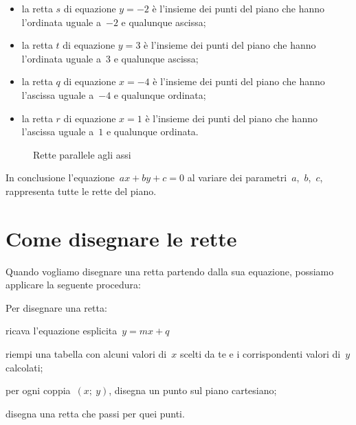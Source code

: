 \begin{itemize} [noitemsep]
 \item la retta \(s\) di equazione \(y=-2\) è l'insieme dei punti del piano 
  che hanno l'ordinata uguale a~\(-2\) e qualunque ascissa;
 \item la retta \(t\) di equazione \(y=3\) è l'insieme dei punti del piano 
  che hanno l'ordinata uguale a~\(3\) e qualunque ascissa;
 \item la retta \(q\) di equazione \(x=-4\) è l'insieme dei punti del piano 
  che hanno l'ascissa uguale a~\(-4\) e qualunque ordinata;
 \item la retta \(r\) di equazione \(x=1\) è l'insieme dei punti del piano 
  che hanno l'ascissa uguale a~\(1\) e qualunque ordinata.
\end{itemize}

\begin{inaccessibleblock}
 \begin{figure}[h]
 \centering
 \begin{minipage}[]{.40\textwidth}
\rettey
 \end{minipage}
 \begin{minipage}[]{.40\textwidth}
\rettex
 \end{minipage}
  \caption{Rette parallele agli assi}\label{fig:rette_p_assi}
\end{figure}
\end{inaccessibleblock}

In conclusione l'equazione~\(ax + by + c = 0\) al variare dei 
parametri~\(a\),~\(b\),~\(c\), rappresenta tutte le rette del piano.

\section{Come disegnare le rette}
\label{sec:retta_disegno}

Quando vogliamo disegnare una retta partendo dalla sua equazione, possiamo
applicare la seguente procedura:

\begin{procedura}
 Per disegnare una retta:
 \begin{enumeratea}
  \item ricava l'equazione esplicita~\(y=mx+q\)
  \item riempi una tabella con alcuni valori di~\(x\) scelti da te e i 
   corrispondenti valori di~\(y\) calcolati;
  \item per ogni coppia~\((x;~y)\), disegna un punto sul piano cartesiano;
  \item disegna una retta che passi per quei punti.
 \end{enumeratea}
\end{procedura}


